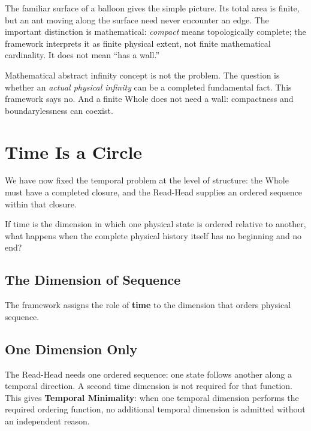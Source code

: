 \documentclass[11pt]{article}
\theoremstyle{canonstyle}
\begin{document}
The familiar surface of a balloon gives the simple picture. Its total area is finite, but an ant moving along the surface need never encounter an edge. The important distinction is mathematical: \emph{compact} means topologically complete; the framework interprets it as finite physical extent, not finite mathematical cardinality. It does not mean ``has a wall.''

\begin{plainwords}
Mathematical abstract infinity concept is not the problem. The question is whether an \emph{actual physical infinity} can be a completed fundamental fact. This framework says no. And a finite Whole does not need a wall: compactness and boundarylessness can coexist.
\end{plainwords}

\newpage
\section{Time Is a Circle}

We have now fixed the temporal problem at the level of structure: the Whole must have a completed closure, and the Read-Head supplies an ordered sequence within that closure.

\begin{reflect}
If time is the dimension in which one physical state is ordered relative to another, what happens when the complete physical history itself has no beginning and no end?
\end{reflect}

\subsection{The Dimension of Sequence}

The framework assigns the role of \textbf{time} to the dimension that orders physical sequence. 

\subsection{One Dimension Only}

The Read-Head needs one ordered sequence: one state follows another along a temporal direction. A second time dimension is not required for that function. This gives \textbf{Temporal Minimality}: when one temporal dimension performs the required ordering function, no additional temporal dimension is admitted without an independent reason.
\end{document}
